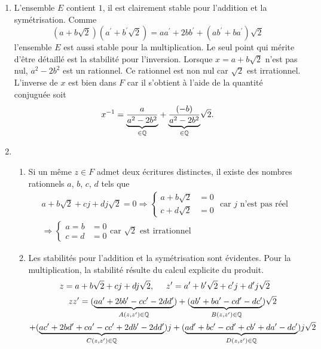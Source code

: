 \begin{enumerate}
\item  L'ensemble $E$ contient $1$, il est clairement stable pour l'addition et la symétrisation. Comme
\begin{displaymath}
 (a+b\sqrt{2})(a^{\prime }+b^{\prime }\sqrt{2})=aa^{\prime}+2bb^{\prime }+(ab^{\prime }+ba^{\prime })\sqrt{2}
\end{displaymath}
l'ensemble $E$ est aussi stable pour la multiplication. Le seul point qui m\'{e}rite d'\^{e}tre d\'{e}taill\'{e} est la stabilit\'{e} pour l'inversion.\newline
Lorsque $x=a+b\sqrt{2}$ n'est pas nul, $a^{2}-2b^{2}$ est un rationnel. Ce rationnel est non nul car $\sqrt{2}$ est irrationnel. L'inverse de $x$ est bien dans $F$ car il s'obtient \`{a} l'aide de la quantit\'{e} conjugu\'{e}e soit 
\[
x^{-1}=\underset{\in \mathbb{Q}}{\underbrace{\frac{a}{a^{2}-2b^{2}}}}+
\underset{\in \mathbb{Q}}{\underbrace{\frac{(-b)}{a^{2}-2b^{2}}}}\sqrt{2}.
\]

\item  \begin{enumerate}
 \item Si un même $z\in F$ admet deux écritures distinctes, il existe des nombres rationnels $a$, $b$, $c$, $d$ tels que
\begin{multline*}
 a+b\sqrt{2} + cj + dj\sqrt{2}=0
\Rightarrow \left\lbrace 
\begin{aligned}
  a+b\sqrt{2} &= 0\\
  c+d\sqrt{2} &= 0
\end{aligned}
\right. \text{ car $j$ n'est pas réel} \\
\Rightarrow
\left\lbrace 
\begin{aligned}
 a=b &=0 \\
 c=d &=0
\end{aligned}
\right. \text{car $\sqrt{2}$ est irrationnel}
\end{multline*}

\item Les stabilités pour l'addition et la symétrisation sont évidentes. Pour la multiplication, la stabilité résulte du calcul explicite du produit.
\begin{displaymath}
z= a+b\sqrt{2} + cj + dj\sqrt{2}, \hspace{0.5cm}
z'= a'+b'\sqrt{2} + c'j + d'j\sqrt{2}
\end{displaymath}
\begin{multline*}
 zz' =
 (\underset{A(z,z')\in \mathbb{Q}}{\underbrace{aa'+2bb'-cc'-2dd'}}) +
(\underset{B(z,z')\in \mathbb{Q}}{\underbrace{ab'+ba'-cd'-dc'}})\sqrt{2} \\ +
(\underset{C(z,z')\in \mathbb{Q}}{\underbrace{ac'+2bd'+ca'-cc'+2db'-2dd'}})j + 
(\underset{D(z,z')\in \mathbb{Q}}{\underbrace{ad'+bc'-cd'+cb'+da'-dc'}})j\sqrt{2}
\end{multline*}


\end{enumerate}
\end{enumerate}
